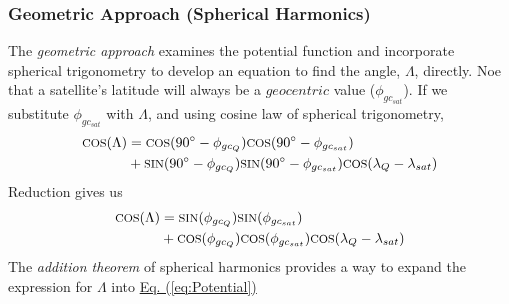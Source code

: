 \begin{multicols}{2}
\subsubsection{Geometric Approach (Spherical Harmonics)}
The \textit{geometric approach} examines the potential function and incorporate spherical trigonometry to develop an equation to find the angle, $\Lambda$, directly. Noe that a satellite's latitude will always be a $geocentric$ value ($\phi_{gc_{sat}}$). If we substitute $\phi_{gc_{sat}}$ with $\Lambda$, and using cosine law of spherical trigonometry,
\begin{gather}
    \begin{split}
    \text{\footnotesize{COS}}(\Lambda) &= \text{\footnotesize{COS}}(90^\circ - \phi_{gc_{Q}})\text{\footnotesize{COS}}(90^\circ - \phi_{gc_{sat}})\\
                  &+\text{\footnotesize{SIN}}(90^\circ - \phi_{gc_{Q}})\text{\footnotesize{SIN}}(90^\circ - \phi_{gc_{sat}})\text{\footnotesize{COS}}(\lambda_Q-\lambda_{sat})
    \end{split}
\end{gather}
Reduction gives us
\begin{gather}
    \begin{split}
        \text{\footnotesize{COS}}(\Lambda)&=\text{\footnotesize{SIN}}(\phi_{gc_{Q}})\text{\footnotesize{SIN}}(\phi_{gc_{sat}})\\
        &+\text{\footnotesize{COS}}(\phi_{gc_{Q}})\text{\footnotesize{COS}}(\phi_{gc_{sat}})\text{\footnotesize{COS}}(\lambda_Q-\lambda_{sat})
    \end{split}
\end{gather}
The \textit{addition theorem} of spherical harmonics provides a way to expand the expression for $\Lambda$ into \hyperref[eq:Potential]{Eq. (\ref*{eq:Potential})}


\end{multicols}
